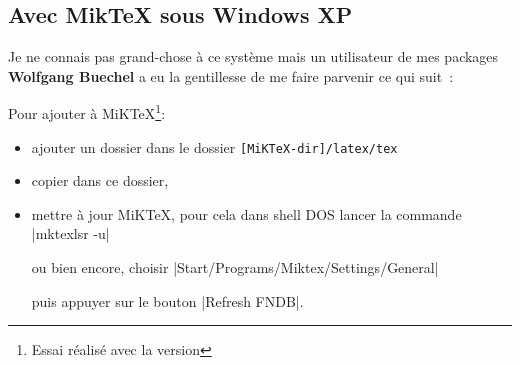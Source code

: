 \subsection{Avec MikTeX sous Windows XP}

Je ne connais pas grand-chose à ce système mais un utilisateur de mes packages \textbf{Wolfgang Buechel} a eu la gentillesse de me faire parvenir ce qui suit~:

Pour ajouter  à MiKTeX\footnote{Essai réalisé avec la version }:

\begin{itemize}\setlength{\itemsep}{10pt}
  \item ajouter un dossier  dans le dossier
       \colorbox{blue!30}{\texttt{[MiKTeX-dir]/latex/tex}}
  \item copier  dans ce dossier,
  \item mettre à jour  MiKTeX, pour cela dans shell DOS lancer la commande   \colorbox{red!50}{|mktexlsr -u|} 
  
   ou bien encore, choisir \colorbox{red!50}{|Start/Programs/Miktex/Settings/General|}
   
    puis appuyer sur le bouton  \colorbox{red!50}{|Refresh FNDB|}.
\end{itemize}

\vfill